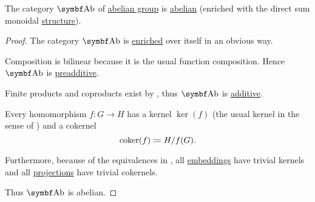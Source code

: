 \begin{proposition}\label{thm:ab_is_abelian}
  The category \( \Cat{Ab} \) of \hyperref[def:abelian_group]{abelian group} is \hyperref[def:abelian_category]{abelian} (enriched with the direct sum monoidal \hyperref[thm:ab_is_monoidal]{structure}).
\end{proposition}
\begin{proof}
  The category \( \Cat{Ab} \) is \hyperref[def:enriched_category]{enriched} over itself in an obvious way.

  Composition is bilinear because it is the usual function composition. Hence \( \Cat{Ab} \) is \hyperref[def:preadditive_category]{preadditive}.

  Finite products and coproducts exist by , thus \( \Cat{Ab} \) is \hyperref[def:additive_category]{additive}.

  Every homomorphism \( f: G \to H \) has a kernel \( \ker(f) \) (the usual kernel in the sense of ) and a cokernel
  \begin{equation*}
    \operatorname{co}\!\ker(f) \coloneqq H / f(G).
  \end{equation*}

  Furthermore, because of the equivalences in , all \hyperref[def:first_order_homomorphism_invertibility/embedding]{embeddings} have trivial kernels and all \hyperref[def:first_order_homomorphism_invertibility/projection]{projections} have trivial cokernels.

  Thus \( \Cat{Ab} \) is abelian.
\end{proof}

